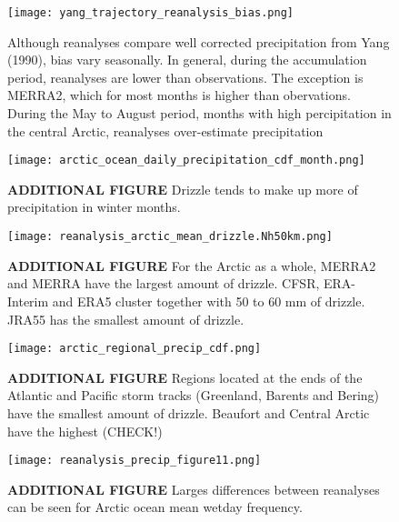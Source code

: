 \documentclass{article}
\begin{document}
\newpage

\begin{figure}[h!]
  \texttt{[image: yang\_trajectory\_reanalysis\_bias.png]}
  \caption{Although reanalyses compare well corrected precipitation from Yang (1990), bias vary seasonally.  In general, during the accumulation period, reanalyses are lower than observations.  The exception is MERRA2, which for most months is higher than obervations.  During the May to August period, months with high percipitation in the central Arctic, reanalyses over-estimate precipitation}
\end{figure}

\newpage

\begin{figure}[ht]
  \texttt{[image: arctic\_ocean\_daily\_precipitation\_cdf\_month.png]}
  \caption{\textbf{ADDITIONAL FIGURE} Drizzle tends to make up more of precipitation in winter months.}
\end{figure}

\newpage

\begin{figure}[ht]
  \texttt{[image: reanalysis\_arctic\_mean\_drizzle.Nh50km.png]}
  \caption{\textbf{ADDITIONAL FIGURE} For the Arctic as a whole, MERRA2 and MERRA have the largest amount of drizzle.  CFSR, ERA-Interim and ERA5 cluster together with 50 to 60 mm of drizzle.  JRA55 has the smallest amount of drizzle.}
\end{figure}

\begin{figure}[ht]
  \texttt{[image: arctic\_regional\_precip\_cdf.png]}
  \caption{\textbf{ADDITIONAL FIGURE} Regions located at the ends of the Atlantic and Pacific storm tracks (Greenland, Barents and Bering) have the smallest amount of drizzle.  Beaufort and Central Arctic have the highest (CHECK!)}
\end{figure}

\newpage

\begin{figure}[h!]
  \texttt{[image: reanalysis\_precip\_figure11.png]}
  \caption{\textbf{ADDITIONAL FIGURE} Larges differences between reanalyses can be seen for Arctic ocean mean wetday frequency.}
\end{figure}
\end{document}
